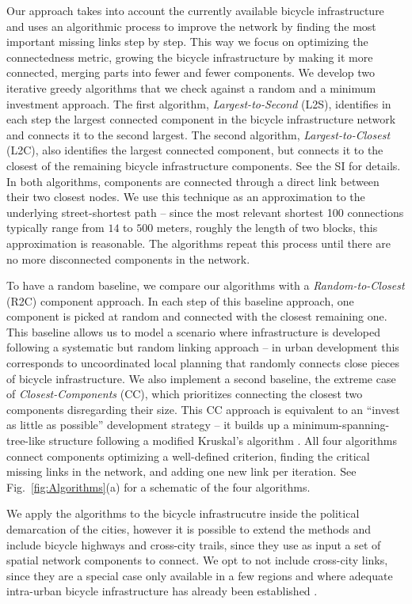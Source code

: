 Our approach takes into account the currently available bicycle infrastructure and uses an algorithmic process to improve the network by finding the most important missing links step by step. This way we focus on optimizing the connectedness metric, growing the bicycle infrastructure by making it more connected, merging parts into fewer and fewer components. We develop two iterative greedy algorithms that we check against a random and a minimum investment approach. The first algorithm, \emph{Largest-to-Second} (L2S), identifies in each step the largest connected component in the bicycle infrastructure network and connects it to the second largest. The second algorithm, \emph{Largest-to-Closest} (L2C), also identifies the largest connected component, but connects it to the closest of the remaining bicycle infrastructure components. See the SI for details. In both algorithms, components are connected through a direct link between their two closest nodes. We use this technique as an approximation to the underlying street-shortest path -- since the most relevant shortest 100 connections typically range from $14$ to $500$ meters, roughly the length of two blocks, this approximation is reasonable. The algorithms repeat this process until there are no more disconnected components in the network.

To have a random baseline, we compare our algorithms with a \emph{Random-to-Closest} (R2C) component approach. In each step of this baseline approach, one component is picked at random and connected with the closest remaining one. This baseline allows us to model a scenario where infrastructure is developed following a systematic but random linking approach -- in urban development this corresponds to uncoordinated local planning that randomly connects close pieces of bicycle infrastructure. We also implement a second baseline, the extreme case of \emph{Closest-Components} (CC), which prioritizes connecting the closest two components disregarding their size. This CC approach is equivalent to an ``invest as little as possible'' development strategy -- it builds up a minimum-spanning-tree-like structure  following a modified Kruskal's algorithm \cite{Kruskal1956Spanning}. All four algorithms connect components optimizing a well-defined criterion, finding the critical missing links in the network, and adding one new link per iteration. See Fig.~\ref{fig:Algorithms}(a) for a schematic of the four algorithms.

We apply the algorithms to the bicycle infrastrucutre inside the political demarcation of the cities, however it is possible to extend the methods and include bicycle highways and cross-city trails, since they use as input a set of spatial network components to connect. We opt to not include cross-city links, since they are a special case only available in a few regions and where adequate intra-urban bicycle infrastructure has already been established \cite{Hildebrandt2013BicycleHighways,Taciuk2018Bicycle}.

